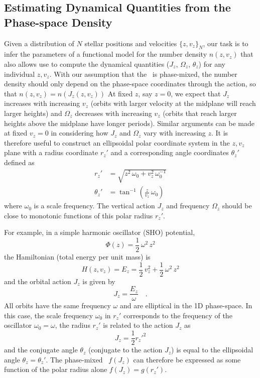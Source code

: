 \subsection{Estimating Dynamical Quantities from the Phase-space Density}

Given a distribution of $N$ stellar positions and velocities $\{z, v_z\}_N$, our task is
to infer the parameters of a functional model for the number density $n(z, v_z)$ that
also allows use to compute the dynamical quantities ($J_z$, $\Omega_z$, $\theta_z$) for
any individual $z, v_z$.
With our assumption that the \df\ is phase-mixed, the number density should only depend
on the phase-space coordinates through the action, so that $n(z, v_z) = n(J_z(z, v_z))$
At fixed $z$, say $z=0$, we expect that $J_z$ increases with increasing $v_z$ (orbits
with larger velocity at the midplane will reach larger heights) and $\Omega_z$
decreases with increasing $v_z$ (orbits that reach larger heights above the midplane
have longer periods).
Similar arguments can be made at fixed $v_z=0$ in considering how $J_z$ and $\Omega_z$
vary with increasing $z$.
It is therefore useful to construct an ellipsoidal polar coordinate system in the $z,
v_z$ plane with a radius coordinate $r_z'$ and a corresponding angle coordinates
$\theta_z'$ defined as
\begin{align}
    r_z' &= \sqrt{z^2 \, \omega_0 + v_z^2 \, \omega_0^{-1}} \label{eq:rzp} \\
    \theta_z' &= \tan^{-1}\left(\frac{z}{v_z}\,\omega_0\right) \label{eq:thetazp}
\end{align}
where $\omega_0$ is a scale frequency.
The vertical action $J_z$ and frequency $\Omega_z$ should be close to monotonic
functions of this polar radius $r_z'$.

For example, in a simple harmonic oscillator (SHO) potential,
\begin{equation}
    \Phi(z) = \frac{1}{2} \, \omega^2 \, z^2
\end{equation}
the Hamiltonian (total energy per unit mass) is
\begin{equation}
    H(z, v_z) = E_z = \frac{1}{2} \, v_z^2 + \frac{1}{2} \, \omega^2 \,z^2
\end{equation}
and the orbital action $J_z$ is given by
\begin{equation}
    J_z = \frac{E_z}{\omega} \quad .
\end{equation}
All orbits have the same frequency $\omega$ and are elliptical in the 1D phase-space.
In this case, the scale frequency $\omega_0$ in $r_z'$ corresponds to the frequency of
the oscillator $\omega_0=\omega$, the radius $r_z'$ is related to the action $J_z$ as
\begin{equation}
    J_z = \frac{1}{2} r_z'^2
\end{equation}
and the conjugate angle $\theta_z$ (conjugate to the action $J_z$) is equal to the
ellipsoidal angle $\theta_z = \theta_z'$.
The phase-mixed \df\ $f(J_z)$ can therefore be expressed as some
function of the polar radius alone $f(J_z)=g(r_z')$.

